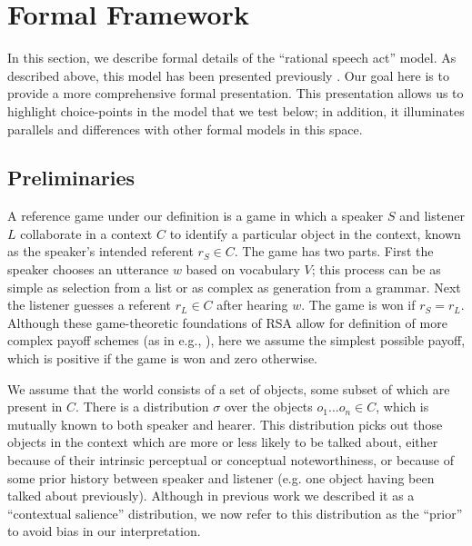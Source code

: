\section{Formal Framework}
\label{sec:models}

In this section, we describe formal details of the ``rational speech act'' model. As described above, this model has been presented previously \cite{frank2012,goodman2013}. Our goal here is to provide a more comprehensive formal presentation. This presentation allows us to highlight choice-points in the model that we test below; in addition, it illuminates parallels and differences with other formal models in this space.



\subsection{Preliminaries}

A reference game under our definition is a game in which a speaker $S$ and listener $L$ collaborate in a context $C$ to identify a particular object in the context, known as the speaker's intended referent $r_S \in C$. The game has two parts. First the speaker chooses an utterance $w$ based on vocabulary $V$; this process can be as simple as selection from a list or as complex as generation from a grammar. Next the listener guesses a referent $r_L \in C$ after hearing $w$. The game is won if $r_S=r_L$. Although these game-theoretic foundations of RSA allow for definition of more complex payoff schemes (as in e.g., ), here we assume the simplest possible payoff, which is positive if the game is won and zero otherwise.

We assume that the world consists of a set of objects, some subset of which are present in $C$. There is a distribution $\sigma$ over the objects ${o_1 ... o_n} \in C$, which is mutually known to both speaker and hearer. This distribution picks out those objects in the context which are more or less likely to be talked about, either because of their intrinsic perceptual or conceptual noteworthiness, or because of some prior history between speaker and listener (e.g. one object having been talked about previously). Although in previous work we described it as a ``contextual salience'' distribution, we now refer to this distribution as the ``prior'' to avoid bias in our interpretation.

